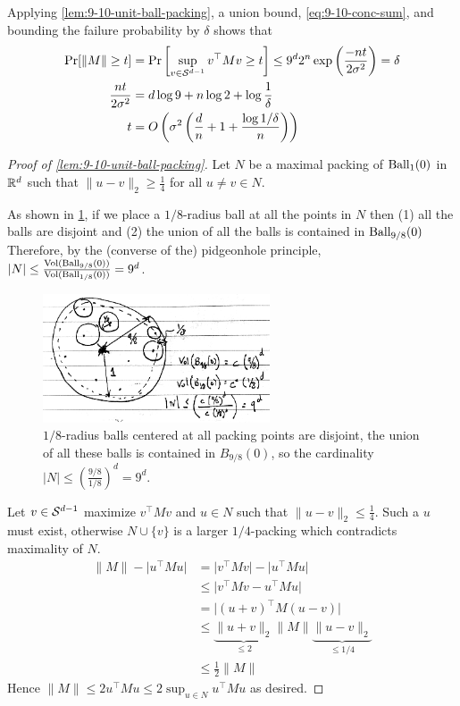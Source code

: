 Applying \cref{lem:9-10-unit-ball-packing}, a union bound, \cref{eq:9-10-conc-sum},
and bounding the failure probability by $\delta$
shows that
\begin{align}
    \Pr[ \|M\| \geq t ]
    &= \Pr\left[ \sup_{v \in \mathcal{S}^{d-1}} v^\top M v \geq t \right]
    \leq 9^d 2^n \exp\left(\frac{-nt}{2 \sigma^2}\right) = \delta \\
    \frac{n t}{2 \sigma^2} &= d \log 9 + n \log 2 + \log \frac{1}{\delta} \\
    t &= O\left(\sigma^2 \left( \frac{d}{n} + 1 + \frac{\log 1/\delta}{n} \right)\right)
\end{align}

\begin{proof}[Proof of \cref{lem:9-10-unit-ball-packing}]
    Let $N$ be a maximal packing of $\operatorname{Ball}_1(0)$ in $\mathbb{R}^d$
    such that $\|u - v\|_2 \geq \frac{1}{4}$ for all $u \neq v \in N$.
    
    As shown in \cref{fig:9-10-1}, if we place a $1/8$-radius ball at all the
    points in $N$ then (1) all the balls are disjoint and (2) the union of all the balls is
    contained in $\operatorname{Ball}_{9/8}(0)$ Therefore, by the (converse of the) pidgeonhole principle,
    $\lvert N \rvert \leq \frac{\operatorname{Vol}(\operatorname{Ball}_{9/8}(0))}{\operatorname{Vol}(\operatorname{Ball}_{1/8}(0))} = 9^d$.
    
    \begin{figure}[H]
        \centering
        \includegraphics[width=0.6\textwidth]{figures/9-10-1.png}
        \caption{$1/8$-radius balls centered
            at all packing points are disjoint, the union of all these balls is contained in $B_{9/8}(0)$,
            so the cardinality $\lvert N \rvert \leq \left(\frac{9/8}{1/8}\right)^d = 9^d$.}
        \label{fig:9-10-1}
    \end{figure}
    
    Let $v \in \mathcal{S}^{d-1}$ maximize $v^\top M v$
    and $u \in N$ such that $\|u - v\|_2 \leq \frac{1}{4}$.
    Such a $u$ must exist,
    otherwise $N \cup \{v\}$ is a larger $1/4$-packing which contradicts maximality of $N$.
    \begin{align}
        \|M\| - \lvert u^\top M u \rvert
        &= \lvert v^\top M v \rvert - \lvert u^\top M u \rvert \\
        &\leq \lvert v^\top M v - u^\top M u \rvert \\
        &= \lvert (u + v)^\top M (u - v) \rvert \\
        &\leq \underbrace{\|u + v\|_2}_{\leq 2} \|M\| \underbrace{\|u - v\|_2}_{\leq 1/4} \\
        &\leq \frac{1}{2} \|M\|
    \end{align}
    Hence $\|M\| \leq 2 u^\top M u \leq 2 \sup_{u \in N} u^\top M u$ as desired.
\end{proof}

